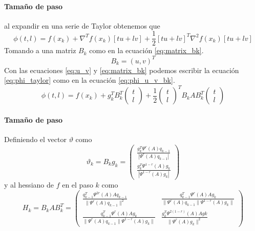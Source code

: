 \begin{frame}{\insertsectionhead}
    \framesubtitle{Tamaño de paso}
    al expandir en una serie de Taylor obtenemos que
    \begin{equation}
        \phi(t,l) = f(x_k)+\nabla^T f(x_k) \left[tu+lv \right] + \frac{1}{2}\left[tu+ lv \right]^T\nabla^2 f(x_k) \left[tu+lv \right] \label{eq:phi_taylor}
    \end{equation}
    Tomando a una matriz $B_k$ como en la ecuación \ref{eq:matrix_bk}.
    \begin{equation}
        B_k =  \left(u, v\right)^T \label{eq:matrix_bk}
    \end{equation}
    Con las ecuaciones \ref{eq:u_v} y \ref{eq:matrix_bk} podemos escribir la ecuación \ref{eq:phi_taylor} como en la ecuación \ref{eq:phi_u_v_bk}.
    \begin{equation}
        \phi(t, l) =  f(x_k)+g_k^TB_k^T\begin{pmatrix}t\\l\end{pmatrix} +\frac{1}{2}\begin{pmatrix}t\\l\end{pmatrix}^TB_k A B_k^T\begin{pmatrix}t\\l\end{pmatrix} \label{eq:phi_u_v_bk}
    \end{equation}
\end{frame}

\begin{frame}{\insertsectionhead}
    \framesubtitle{Tamaño de paso}
    Definiendo el vector $\vartheta$ como
    \begin{equation}
        \vartheta_k = B_kg_k =
        \begin{pmatrix}
            \frac{g_k^T\Psi^r(A)q_{k-1}}{|\Psi^{r}(A)q_{k-1}|} \\[0.25cm]
            \frac{g_k^T\Psi^{1-r}(A)g_k}{|\Psi^{1-r}(A)g_k|}
        \end{pmatrix}
        \label{eq:vartheta_k}
    \end{equation}
    y al hessiano de $f$ en el paso $k$ como
    \begin{equation}
        H_k = B_kAB_k^T =\begin{pmatrix}
            \frac{q_{k-1}^T\Psi^{2r}(A)Aq_{k-1}}{\|\Psi^{r}(A)q_{k-1}\|^2}             & \frac{q_{k-1}^T\Psi^r(A)Ag_{k}}{\|\Psi^{r}(A)q_{k-1}\|\Psi^{1-r}(A)g_k\| } \\
            \frac{q_{k-1}^T\Psi^r(A)Ag_{k}}{\|\Psi^{r}(A)q_{k-1}\|\Psi^{1-r}(A)g_k\| } &
            \frac{g_k^T\Psi^{2(1-r)}(A)Ag{k}}{\|\Psi^{r}(A)g_k\|^2}
        \end{pmatrix} \label{eq:hk_bkabk}
    \end{equation}
\end{frame}

